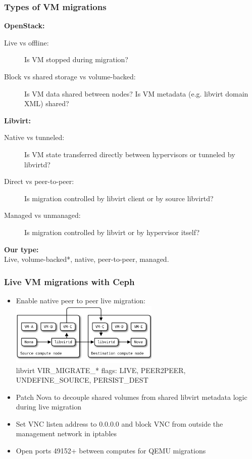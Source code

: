 \documentclass[hyperref=unicode,utf8,xcolor=pst]{beamer}
\begin{document}
\begin{frame}
	\frametitle{Types of VM migrations}
	{\bf OpenStack:}
	\begin{description}
		\item [Live vs offline:] Is VM stopped during migration?
		\item [Block vs shared storage vs volume-backed:] Is VM
			data shared between nodes? Is VM metadata
			(e.g. libvirt domain XML) shared?
	\end{description}

	{\bf Libvirt:}
	\begin{description}
		\item [Native vs tunneled:] Is VM state transferred
			directly between hypervisors or tunneled by
			libvirtd?
		\item [Direct vs peer-to-peer:] Is migration controlled
			by libvirt client or by source libvirtd?
		\item [Managed vs unmanaged:] Is migration controlled by
			libvirt or by hypervisor itself?
	\end{description}

	{\bf Our type:}\\
	Live, volume-backed*, native, peer-to-peer, managed.
\end{frame}

\begin{frame}
	\frametitle{Live VM migrations with Ceph}
	\begin{itemize}
		\item Enable native peer to peer live migration:\\
			\includegraphics[height=3cm]{libvirt-p2p-migration}\\
			libvirt VIR\_MIGRATE\_* flags: LIVE, PEER2PEER,
			UNDEFINE\_SOURCE, PERSIST\_DEST
		\item Patch Nova to decouple shared volumes from shared
			libvirt metadata logic during live migration
		\item Set VNC listen address to 0.0.0.0 and block VNC
			from outside the management network in iptables
		\item Open ports 49152+ between computes for QEMU
			migrations
	\end{itemize}
\end{frame}
\end{document}
